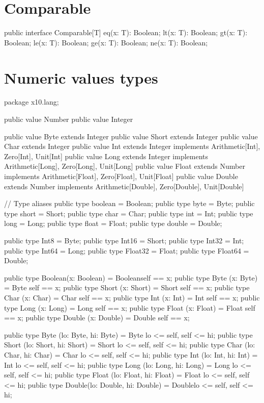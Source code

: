 \section{Comparable}

\begin{xten}
public interface Comparable[T] {
    eq(x: T): Boolean;
    lt(x: T): Boolean;
    gt(x: T): Boolean;
    le(x: T): Boolean;
    ge(x: T): Boolean;
    ne(x: T): Boolean;
}
\end{xten}

\section{Numeric values types}

\begin{xten}
package x10.lang;

public value Number { }
public value Integer { }

public value Byte    extends Integer { }
public value Short   extends Integer { }
public value Char    extends Integer { }
public value Int     extends Integer implements
    Arithmetic[Int], Zero[Int], Unit[Int]{ }
public value Long    extends Integer implements
    Arithmetic[Long], Zero[Long], Unit[Long] { }
public value Float   extends Number  implements
    Arithmetic[Float], Zero[Float], Unit[Float] { }
public value Double  extends Number  implements
    Arithmetic[Double], Zero[Double], Unit[Double] { }

// Type aliases
public type boolean = Boolean;
public type byte = Byte;
public type short = Short;
public type char = Char;
public type int = Int;
public type long = Long;
public type float = Float;
public type double = Double;

public type Int8    = Byte;
public type Int16   = Short;
public type Int32   = Int;
public type Int64   = Long;
public type Float32 = Float;
public type Float64 = Double;

public type Boolean(x: Boolean) = Boolean{self == x};
public type Byte   (x: Byte)    = Byte   {self == x};
public type Short  (x: Short)   = Short  {self == x};
public type Char   (x: Char)    = Char   {self == x};
public type Int    (x: Int)     = Int    {self == x};
public type Long   (x: Long)    = Long   {self == x};
public type Float  (x: Float)   = Float  {self == x};
public type Double (x: Double)  = Double {self == x};

public type Byte  (lo: Byte,   hi: Byte)  
          = Byte  {lo <= self, self <= hi};
public type Short (lo: Short,  hi: Short) 
          = Short {lo <= self, self <= hi};
public type Char  (lo: Char,   hi: Char)  
          = Char  {lo <= self, self <= hi};
public type Int   (lo: Int,    hi: Int)   
          = Int   {lo <= self, self <= hi};
public type Long  (lo: Long,   hi: Long)  
          = Long  {lo <= self, self <= hi};
public type Float (lo: Float,  hi: Float) 
          = Float {lo <= self, self <= hi};
public type Double(lo: Double, hi: Double)
          = Double{lo <= self, self <= hi};


\end{xten}
